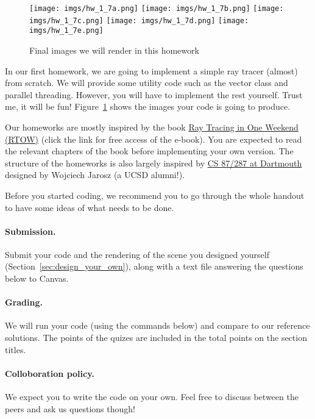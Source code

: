 



\setcounter{section}{-1}

\begin{figure}[ht]
    \centering
    \texttt{[image: imgs/hw\_1\_7a.png]}
    \texttt{[image: imgs/hw\_1\_7b.png]}
    \texttt{[image: imgs/hw\_1\_7c.png]}
    \texttt{[image: imgs/hw\_1\_7d.png]}
    \texttt{[image: imgs/hw\_1\_7e.png]}
    \caption{Final images we will render in this homework}
    \label{fig:teaser}
\end{figure}

In our first homework, we are going to implement a simple ray tracer (almost) from scratch.
We will provide some utility code such as the vector class and parallel threading. 
However, you will have to implement the rest yourself. Trust me, it will be fun! Figure~\ref{fig:teaser} shows the images your code is going to produce.

Our homeworks are mostly inspired by the book \href{https://raytracing.github.io/}{Ray Tracing in One Weekend (RTOW)} (click the link for free access of the e-book). You are expected to read the relevant chapters of the book before implementing your own version. The structure of the homeworks is also largely inspired by \href{https://cs87-dartmouth.github.io/Fall2022/assignments.html}{CS 87/287 at Dartmouth} designed by Wojciech Jarosz (a UCSD alumni!).

Before you started coding, we recommend you to go through the whole handout to have some ideas of what needs to be done.

\paragraph{Submission.} Submit your code and the rendering of the scene you designed yourself (Section~\ref{sec:design_your_own}), along with a text file answering the questions below to Canvas.

\paragraph{Grading.} We will run your code (using the commands below) and compare to our reference solutions. The points of the quizes are included in the total points on the section titles.

\paragraph{Colloboration policy.} We expect you to write the code on your own. Feel free to discuss between the peers and ask us questions though!

